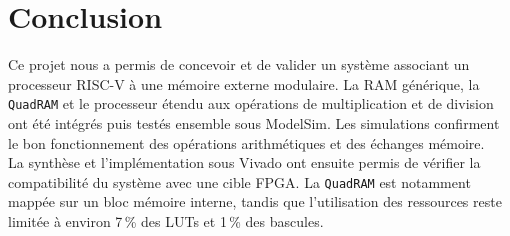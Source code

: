 \section{Conclusion}

Ce projet nous a permis de concevoir et de valider un système associant un processeur RISC-V à une mémoire externe modulaire. La RAM générique, la \texttt{QuadRAM} et le processeur étendu aux opérations de multiplication et de division ont été intégrés puis testés ensemble sous ModelSim. Les simulations confirment le bon fonctionnement des opérations arithmétiques et des échanges mémoire. \\

La synthèse et l'implémentation sous Vivado ont ensuite permis de vérifier la compatibilité du système avec une cible FPGA. La \texttt{QuadRAM} est notamment mappée sur un bloc mémoire interne, tandis que l'utilisation des ressources reste limitée à environ 7\,\% des LUTs et 1\,\% des bascules.
